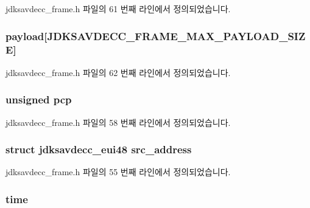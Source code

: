 jdksavdecc\+\_\+frame.\+h 파일의 61 번째 라인에서 정의되었습니다.

\subsubsection[{\texorpdfstring{payload}{payload}}]{ payload\mbox{[}{\bf J\+D\+K\+S\+A\+V\+D\+E\+C\+C\+\_\+\+F\+R\+A\+M\+E\+\_\+\+M\+A\+X\+\_\+\+P\+A\+Y\+L\+O\+A\+D\+\_\+\+S\+I\+ZE}\mbox{]}}\hypertarget{structjdksavdecc__frame_a220ad076814a31ae0163e722e523de46}{}\label{structjdksavdecc__frame_a220ad076814a31ae0163e722e523de46}


jdksavdecc\+\_\+frame.\+h 파일의 62 번째 라인에서 정의되었습니다.

\subsubsection[{\texorpdfstring{pcp}{pcp}}]{\setlength{\rightskip}{0pt plus 5cm}unsigned pcp}\hypertarget{structjdksavdecc__frame_a7f33a59d77ba03f3fc3cefd0d2f4f434}{}\label{structjdksavdecc__frame_a7f33a59d77ba03f3fc3cefd0d2f4f434}


jdksavdecc\+\_\+frame.\+h 파일의 58 번째 라인에서 정의되었습니다.

\subsubsection[{\texorpdfstring{src\+\_\+address}{src_address}}]{\setlength{\rightskip}{0pt plus 5cm}struct {\bf jdksavdecc\+\_\+eui48} src\+\_\+address}\hypertarget{structjdksavdecc__frame_a74855d22d112da72f29ba4959ebc639b}{}\label{structjdksavdecc__frame_a74855d22d112da72f29ba4959ebc639b}


jdksavdecc\+\_\+frame.\+h 파일의 55 번째 라인에서 정의되었습니다.

\subsubsection[{\texorpdfstring{time}{time}}]{ time}\hypertarget{structjdksavdecc__frame_adb3aaacbdb2a17782b3b1a077e98b7ef}{}\label{structjdksavdecc__frame_adb3aaacbdb2a17782b3b1a077e98b7ef}


